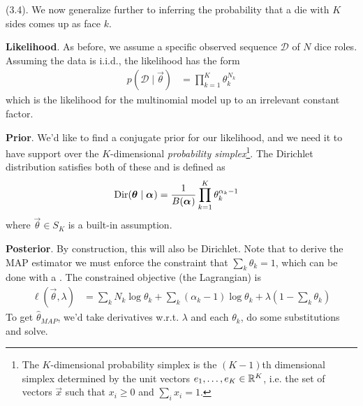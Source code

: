 \documentclass[11pt]{article}
\begin{document}
\myspace
\p {} (3.4). We now generalize further to inferring the probability that a die with $K$ sides comes up as face $k$. 
\begin{compactitem}
	\item \textbf{Likelihood}. As before, we assume a specific observed sequence $\mathcal D$ of $N$ dice roles. Assuming the data is i.i.d., the likelihood has the form
	\begin{align}
		p(\mathcal D \mid \vec\theta) 
			&= \prod_{k=1}^K \theta_k^{N_k}
	\end{align}
	which is the likelihood for the multinomial model up to an irrelevant constant factor.
	
	\item \textbf{Prior}. We'd like to find a conjugate prior for our likelihood, and we need it to have support over the $K$-dimensional \textit{probability simplex}\footnote{The $K$-dimensional probability simplex is the $(K-1)$th dimensional simplex determined by the unit vectors $e_1, \ldots, e_K \in \mathbb{R}^K$, i.e. the set of vectors $\vec x$ such that $x_i \ge 0$ and $\sum_i x_i = 1$.}. The Dirichlet distribution satisfies both of these and is defined as
	\begin{align}
		\text{Dir}(\bm{\theta}_{} \mid \bm{\alpha}_{}) 
			&= \frac{1}{B(\bm{\alpha}_{})} \prod_{k=1}^K \theta_k^{\alpha_k - 1} 
	\end{align}
	where $\vec\theta \in S_K$ is a built-in assumption.
	
	\item \textbf{Posterior}. By construction, this will also be Dirichlet. Note that to derive the MAP estimator we must enforce the constraint that $\sum_k \theta_k = 1$, which can be done with a . The constrained objective (the Lagrangian) is 
	\begin{align}
		\ell(\vec\theta, \lambda)
			&= \sum_k N_k \log\theta_k + \sum_k (\alpha_k - 1)\log\theta_k 
				+ \lambda \left(   1 - \sum_k \theta_k  \right)
	\end{align}
	To get $\hat{\theta}_{MAP}$, we'd take derivatives w.r.t. $\lambda$ and each $\theta_k$, do some substitutions and solve. 
\end{compactitem}	
\end{document}
